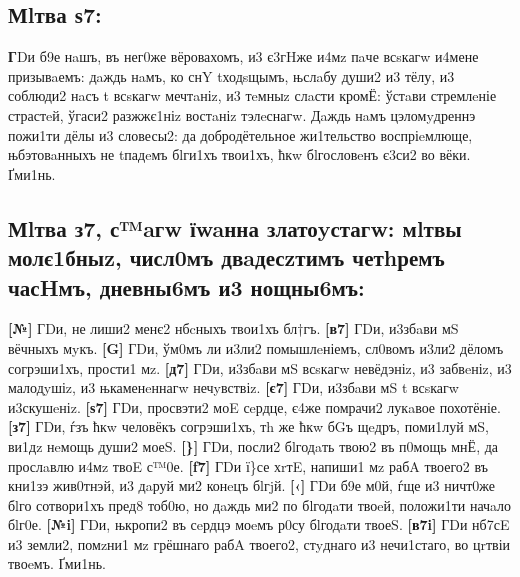 \subsection[Молитва 6]{Мlтва ѕ7:}

\textbf{Г}Dи б9е нaшъ, въ нег0же вёровахомъ, и3 є3гHже и4мz пaче всsкагw и4мене
призывaемъ: дaждь нaмъ, ко снY tходsщымъ, њслaбу души2 и3 тёлу, и3
соблюди2 нaсъ t всsкагw мечтaніz, и3 тeмныz слaсти кромЁ: ўстaви
стремлeніе страстeй, ўгаси2 разжжє1ніz востaніz тэлeснагw. Дaждь нaмъ
цэломyдреннэ пожи1ти дёлы и3 словесы2: да добродётельное жи1тельство
воспріeмлюще, њбэтовaнныхъ не tпадeмъ бlги1хъ твои1хъ, ћкw бlгословeнъ
є3си2 во вёки. Ґми1нь.

\subsection[Молитва 7, святаго Иоанна Златоустаго: молитвы молебныя,
    числом двадесятим четырем часом, дневным и нощным]
{Мlтва з7, с™aгw їwaнна златоyстагw: мlтвы молє1бныz,
    числ0мъ двaдесzтимъ четhремъ часHмъ, дневны6мъ и3 нощны6мъ:}

\textbf{{[}№{]}} ГDи, не лиши2 менє2 нбcныхъ твои1хъ бл†гъ.
\textbf{{[}в7{]}} ГDи, и3збaви мS вёчныхъ мyкъ. \textbf{{[}G{]}} ГDи,
ўм0мъ ли и3ли2 помышлeніемъ, сл0вомъ и3ли2 дёломъ согрэши1хъ, прости1
мz. \textbf{{[}д7{]}} ГDи, и3збaви мS всsкагw невёдэніz, и3 забвeніz, и3
малодyшіz, и3 њкаменeннагw нечyвствіz. \textbf{{[}є7{]}} ГDи, и3збaви мS
t всsкагw и3скушeніz. \textbf{{[}ѕ7{]}} ГDи, просвэти2 моE сeрдце, є4же
помрачи2 лукaвое похотёніе. \textbf{{[}з7{]}} ГDи, ѓзъ ћкw человёкъ
согрэши1хъ, тh же ћкw бGъ щeдръ, поми1луй мS, ви1дz нeмощь души2 моеS.
\textbf{{[}\}{]}} ГDи, посли2 бlгодaть твою2 въ п0мощь мнЁ, да прослaвлю
и4мz твоE с™0е. \textbf{{[}f7{]}} ГDи ї\}се хrтE, напиши1 мz рабA
твоего2 въ кни1зэ жив0тнэй, и3 дaруй ми2 конeцъ бlгjй. \textbf{{[}‹{]}}
ГDи б9е м0й, ѓще и3 ничт0же бlго сотвори1хъ пред8 тоб0ю, но дaждь ми2 по
бlгодaти твоeй, положи1ти начaло бlг0е. \textbf{{[}№i{]}} ГDи, њкропи2
въ сeрдцэ моeмъ р0су бlгодaти твоеS. \textbf{{[}в7i{]}} ГDи нб7сE и3
земли2, помzни1 мz грёшнаго рабA твоего2, стyднаго и3 нечи1стаго, во
цrтвіи твоeмъ. Ґми1нь.

